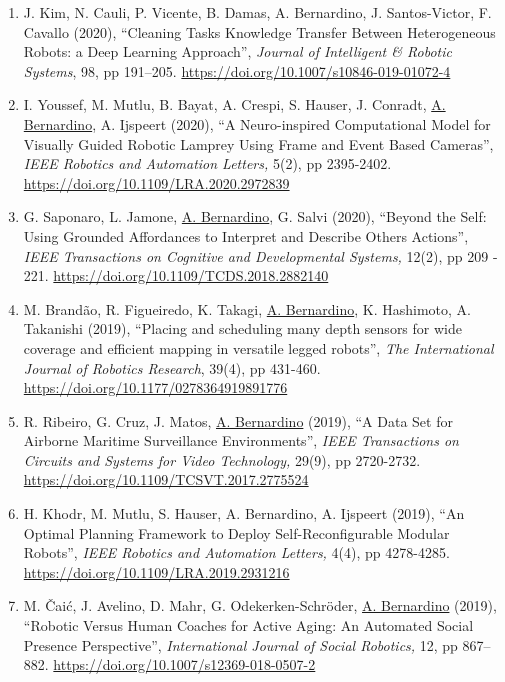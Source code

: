 \begin{enumerate}
  statistics for 3D Model-Based UAV Tracking'', \emph{IEEE Access,} 8,
  pp 33884-33897. \url{https://www.doi.org/10.1109/ACCESS.2020.2973970}~
\item
  J. Kim, N. Cauli, P. Vicente, B. Damas, A. Bernardino, J.
  Santos-Victor, F. Cavallo (2020), ``Cleaning Tasks Knowledge Transfer
  Between Heterogeneous Robots: a Deep Learning Approach'',
  \emph{Journal of Intelligent \& Robotic Systems}, 98, pp 191--205.
  \url{https://doi.org/10.1007/s10846-019-01072-4}
\item
  I. Youssef, M. Mutlu, B. Bayat, A. Crespi, S. Hauser, J. Conradt,
  \ul{A. Bernardino}, A. Ijspeert (2020), ``A Neuro-inspired
  Computational Model for Visually Guided Robotic Lamprey Using Frame
  and Event Based Cameras'', \emph{IEEE Robotics and Automation
  Letters,} 5(2), pp 2395-2402.
  \url{https://doi.org/10.1109/LRA.2020.2972839}
\item
  G. Saponaro, L. Jamone, \ul{A. Bernardino}, G. Salvi (2020), ``Beyond
  the Self: Using Grounded Affordances to Interpret and Describe
  Others\textquotesingle{} Actions'', \emph{IEEE Transactions on
  Cognitive and Developmental Systems,} 12(2), pp 209 - 221.
  \url{https://doi.org/10.1109/TCDS.2018.2882140}~
\item
  M. Brandão, R. Figueiredo, K. Takagi, \ul{A. Bernardino}, K.
  Hashimoto, A. Takanishi (2019), ``Placing and scheduling many depth
  sensors for wide coverage and efficient mapping in versatile legged
  robots'', \emph{The International Journal of Robotics Research},
  39(4), pp 431-460. \url{https://doi.org/10.1177/0278364919891776}~
\item
  R. Ribeiro, G. Cruz, J. Matos, \ul{A. Bernardino} (2019), ``A Data Set
  for Airborne Maritime Surveillance Environments'', \emph{IEEE
  Transactions on Circuits and Systems for Video Technology,} 29(9), pp
  2720-2732. \url{https://doi.org/10.1109/TCSVT.2017.2775524}~~
\item
  H. Khodr, M. Mutlu, S. Hauser, A. Bernardino, A. Ijspeert (2019), ``An
  Optimal Planning Framework to Deploy Self-Reconfigurable Modular
  Robots'', \emph{IEEE Robotics and Automation Letters,} 4(4), pp
  4278-4285. \url{https://doi.org/10.1109/LRA.2019.2931216}~
\item
  M. Čaić, J. Avelino, D. Mahr, G. Odekerken-Schröder, \ul{A.
  Bernardino} (2019), ``Robotic Versus Human Coaches for Active Aging:
  An Automated Social Presence Perspective'', \emph{International
  Journal of Social Robotics,} 12, pp 867--882.
  \url{https://doi.org/10.1007/s12369-018-0507-2}~

\end{enumerate}
